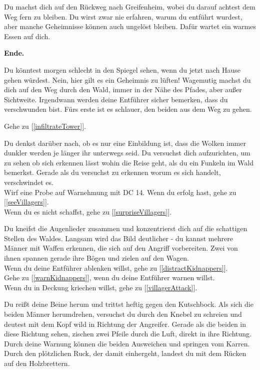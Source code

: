 Du machst dich auf den Rückweg nach Greifenheim, wobei du darauf achtest dem Weg fern zu bleiben.
Du wirst zwar nie erfahren, warum du entführt wurdest, aber manche Geheimnisse können auch ungelöst bleiben. Dafür wartet ein warmes Essen auf dich.

\textbf{Ende.}


Du könntest morgen schlecht in den Spiegel sehen, wenn du jetzt nach Hause gehen würdest. Nein, hier gilt es ein Geheimnis zu lüften! Wagemutig machst du dich auf den Weg durch den Wald, immer in der Nähe des Pfades, aber außer Sichtweite. Irgendwann werden deine Entführer sicher bemerken, dass du verschwunden bist. Fürs erste ist es schlauer, den beiden aus dem Weg zu gehen.

Gehe zu [\ref{infiltrateTower}].


Du denkst darüber nach, ob es nur eine Einbildung ist, dass die Wolken immer dunkler werden je länger ihr unterwegs seid. Du versuchst dich aufzurichten, um zu sehen ob sich erkennen lässt wohin die Reise geht, als du ein Funkeln im Wald bemerkst. Gerade als du versuchst zu erkennen worum es sich handelt, verschwindet es.
\\Wirf eine Probe auf Warnehmung mit DC 14. Wenn du erfolg hast, gehe zu [\ref{seeVillagers}].
\\Wenn du es nicht schaffst, gehe zu [\ref{surpriseVillagers}].


Du kneifst die Augenlieder zusammen und konzentrierst dich auf die schattigen Stellen des Waldes. Langsam wird das Bild deutlicher - du kannst mehrere Männer mit Waffen erkennen, die sich auf den Angriff vorbereiten. Zwei von ihnen spannen gerade ihre Bögen und zielen auf den Wagen.
\\Wenn du deine Entführer ablenken willst, gehe zu [\ref{distractKidnappers}].
\\Gehe zu [\ref{warnKidnappers}], wenn du deine Entführer warnen willst.
\\Wenn du in Deckung kriechen willst, gehe zu [\ref{villagerAttack}].


Du reißt deine Beine herum und trittst heftig gegen den Kutschbock. Als sich die beiden Männer herumdrehen, versuchst du durch den Knebel zu schreien und deutest mit dem Kopf wild in Richtung der Angreifer. Gerade als die beiden in diese Richtung sehen, zischen zwei Pfeile durch die Luft, direkt in ihre Richtung. Durch deine Warnung können die beiden Ausweichen und springen vom Karren. Durch den plötzlichen Ruck, der damit einhergeht, landest du mit dem Rücken auf den Holzbrettern.

